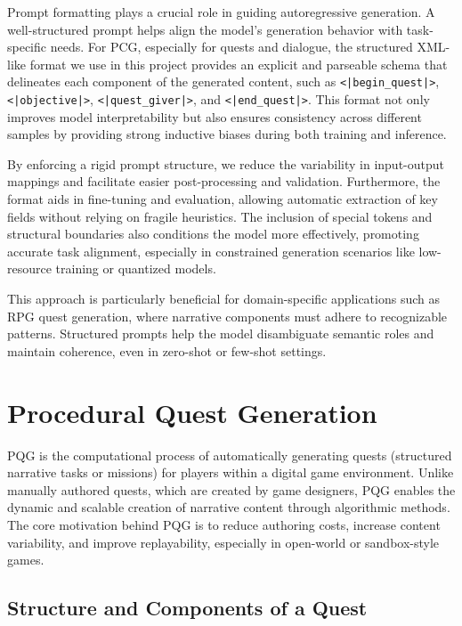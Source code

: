 Prompt formatting plays a crucial role in guiding autoregressive generation. A well-structured
prompt helps align the model's generation behavior with task-specific needs.
For PCG, especially for quests and dialogue, the structured XML-like format we use in
this project provides an explicit and parseable schema that delineates each component of
the generated content, such as \texttt{<|begin\_quest|>}, \texttt{<|objective|>}, \texttt{<|quest\_giver|>}, and
\texttt{<|end\_quest|>}. This format not only improves model interpretability but also ensures
consistency across different samples by providing strong inductive biases during both
training and inference.

By enforcing a rigid prompt structure, we reduce the variability in input-output mappings
and facilitate easier post-processing and validation. Furthermore, the format aids
in fine-tuning and evaluation, allowing automatic extraction of key fields without relying
on fragile heuristics. The inclusion of special tokens and structural boundaries also
conditions the model more effectively, promoting accurate task alignment, especially in
constrained generation scenarios like low-resource training or quantized models.

This approach is particularly beneficial for domain-specific applications such as RPG
quest generation, where narrative components must adhere to recognizable patterns.
Structured prompts help the model disambiguate semantic roles and maintain coherence,
even in zero-shot or few-shot settings.

\section{Procedural Quest Generation}

PQG is the computational process of automatically generating quests (structured narrative
tasks or missions) for players within a digital game environment. Unlike manually
authored quests, which are created by game designers, PQG enables the dynamic and
scalable creation of narrative content through algorithmic methods. The core motivation
behind PQG is to reduce authoring costs, increase content variability, and improve
replayability, especially in open-world or sandbox-style games.

\subsection{Structure and Components of a Quest}

